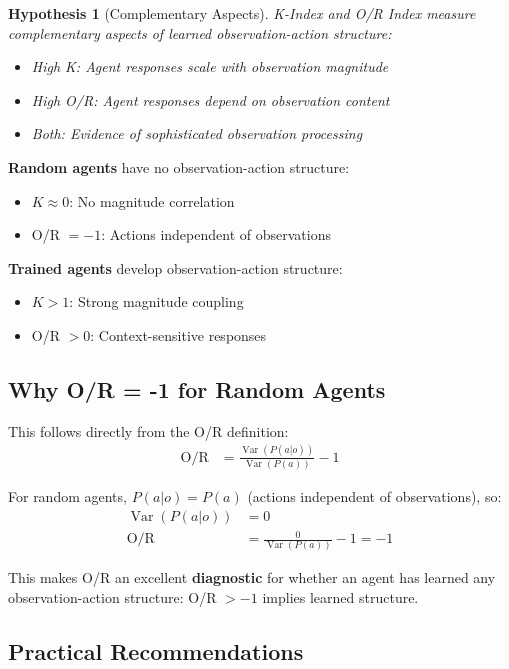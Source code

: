 \documentclass[twoside]{article}
\DeclareMathOperator{\Var}{Var}
\newtheorem{hypothesis}{Hypothesis}
\theoremstyle{remark}
\begin{document}
\begin{hypothesis}[Complementary Aspects]
K-Index and O/R Index measure \emph{complementary} aspects of learned
observation-action structure:
\begin{itemize}
    \item High K: Agent responses scale with observation magnitude
    \item High O/R: Agent responses depend on observation content
    \item Both: Evidence of sophisticated observation processing
\end{itemize}
\end{hypothesis}

\textbf{Random agents} have no observation-action structure:
\begin{itemize}
    \item $K \approx 0$: No magnitude correlation
    \item O/R $= -1$: Actions independent of observations
\end{itemize}

\textbf{Trained agents} develop observation-action structure:
\begin{itemize}
    \item $K > 1$: Strong magnitude coupling
    \item O/R $> 0$: Context-sensitive responses
\end{itemize}

\subsection{Why O/R = -1 for Random Agents}

This follows directly from the O/R definition:
\begin{align}
\text{O/R} &= \frac{\Var(P(a|o))}{\Var(P(a))} - 1
\end{align}

For random agents, $P(a|o) = P(a)$ (actions independent of observations), so:
\begin{align}
\Var(P(a|o)) &= 0 \\
\text{O/R} &= \frac{0}{\Var(P(a))} - 1 = -1
\end{align}

This makes O/R an excellent \textbf{diagnostic} for whether an agent has learned
any observation-action structure: O/R $> -1$ implies learned structure.

\subsection{Practical Recommendations}
\end{document}
